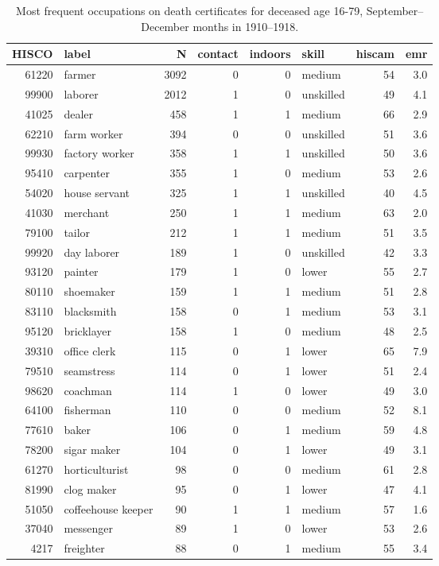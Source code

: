 \begin{table}[h!]
\centering
\begin{tabular}{rlrrrlrr}
  \hline
HISCO & label & N & contact & indoors & skill & hiscam & emr \\ 
  \hline
61220 & farmer & 3092 &  0 &  0 & medium & 54 & 3.0 \\ 
  99900 & laborer & 2012 &  1 &  0 & unskilled & 49 & 4.1 \\ 
  41025 & dealer & 458 &  1 &  1 & medium & 66 & 2.9 \\ 
  62210 & farm worker & 394 &  0 &  0 & unskilled & 51 & 3.6 \\ 
  99930 & factory worker & 358 &  1 &  1 & unskilled & 50 & 3.6 \\ 
  95410 & carpenter & 355 &  1 &  0 & medium & 53 & 2.6 \\ 
  54020 & house servant & 325 &  1 &  1 & unskilled & 40 & 4.5 \\ 
  41030 & merchant & 250 &  1 &  1 & medium & 63 & 2.0 \\ 
  79100 & tailor & 212 &  1 &  1 & medium & 51 & 3.5 \\ 
  99920 & day laborer & 189 &  1 &  0 & unskilled & 42 & 3.3 \\ 
  93120 & painter & 179 &  1 &  0 & lower & 55 & 2.7 \\ 
  80110 & shoemaker & 159 &  1 &  1 & medium & 51 & 2.8 \\ 
  83110 & blacksmith & 158 &  0 &  1 & medium & 53 & 3.1 \\ 
  95120 & bricklayer & 158 &  1 &  0 & medium & 48 & 2.5 \\ 
  39310 & office clerk & 115 &  0 &  1 & lower & 65 & 7.9 \\ 
  79510 & seamstress & 114 &  0 &  1 & lower & 51 & 2.4 \\ 
  98620 & coachman & 114 &  1 &  0 & lower & 49 & 3.0 \\ 
  64100 & fisherman & 110 &  0 &  0 & medium & 52 & 8.1 \\ 
  77610 & baker & 106 &  0 &  1 & medium & 59 & 4.8 \\ 
  78200 & sigar maker & 104 &  0 &  1 & lower & 49 & 3.1 \\ 
  61270 & horticulturist & 98 &  0 &  0 & medium & 61 & 2.8 \\ 
  81990 & clog maker & 95 &  0 &  1 & lower & 47 & 4.1 \\ 
  51050 & coffeehouse keeper & 90 &  1 &  1 & medium & 57 & 1.6 \\ 
  37040 & messenger & 89 &  1 &  0 & lower & 53 & 2.6 \\ 
  4217 & freighter & 88 &  0 &  1 & medium & 55 & 3.4 \\ 
   \hline
\end{tabular}
\caption{Most frequent occupations on death certificates for deceased age 16-79, September--December months in 1910--1918.} 
\label{tab:topoccs_selected}
\end{table}
